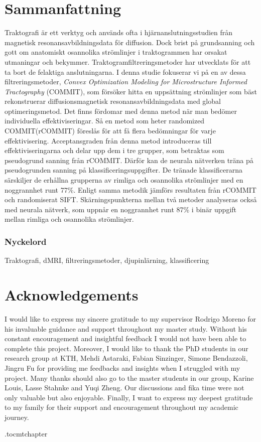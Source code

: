 \chapter*{Sammanfattning}
Traktografi är ett verktyg och används ofta i hjärnanslutningsstudien från
magnetisk resonansavbildningsdata för diffusion. Dock brist på grundsanning och gott om
anatomiskt osannolika strömlinjer i traktogrammen har orsakat utmaningar och bekymmer.
Traktogramfiltreringsmetoder har utvecklats för att ta bort de felaktiga anslutningarna.
I denna studie fokuserar vi på en av dessa filtreringsmetoder, \textit{Convex Optimization Modeling for Microstructure Informed Tractography} (COMMIT),
som försöker hitta en uppsättning strömlinjer som bäst rekonstruerar diffusionsmagnetisk resonansavbildningsdata med global optimeringsmetod.
Det finns fördomar med denna metod när man bedömer individuella effektiviseringar.
Så en metod som heter randomized COMMIT(rCOMMIT) föreslås för att få flera bedömningar för varje effektivisering.
Acceptansgraden från denna metod introduceras till effektiviseringarna och delar upp dem i tre grupper, som
betraktas som pseudogrund sanning från rCOMMIT. Därför kan de neurala nätverken träna på pseudogrunden sanning på
klassificeringsuppgifter. De tränade klassificerarna särskiljer de erhållna grupperna av rimliga och osannolika strömlinjer med en noggrannhet runt 77\%.
Enligt samma metodik jämförs resultaten från rCOMMIT och randomiserat SIFT.
Skärningspunkterna mellan två metoder analyseras också med neurala nätverk, som uppnår en noggrannhet runt 87\% i binär uppgift mellan rimliga och osannolika strömlinjer.
\subsection*{Nyckelord}
Traktografi, dMRI, filtreringsmetoder, djupinlärning, klassificering

\newpage
\thispagestyle{plain}
\chapter*{Acknowledgements}
I would like to express my sincere gratitude to my supervisor Rodrigo Moreno for his invaluable guidance and support 
throughout my master study. Without his constant encouragement and insightful feedback I would not have been able to complete this project.
Moreover, I would like to thank the PhD students in our research group at KTH, 
Mehdi Astaraki, Fabian Sinzinger, Simone Bendazzoli, Jingru Fu for providing me feedbacks and insights when I struggled with my project.
Many thanks should also go to the master students in our group, Karine Louis, Lasse Stahnke and Yuqi Zheng. 
Our discussions and fika time were not only valuable but also enjoyable.
Finally, I want to express my deepest gratitude to my family for their support and encouragement throughout my academic journey.

\newpage

% 

\newpage

\etocdepthtag.toc{mtchapter}
\thispagestyle{plain}
\tableofcontents

\newpage


